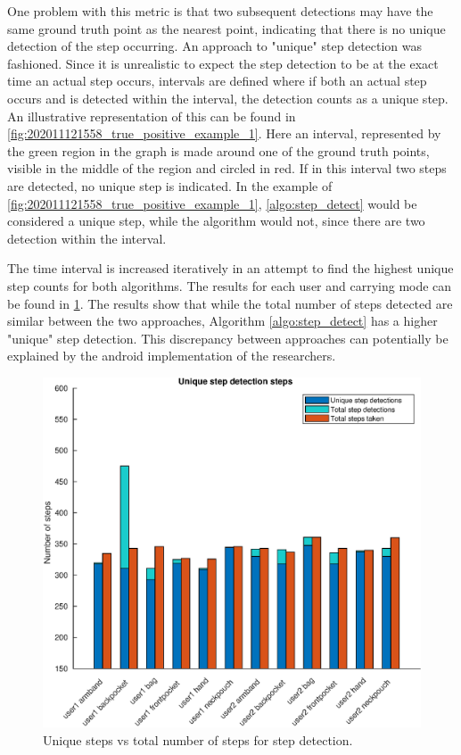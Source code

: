 One problem with this metric is that two subsequent detections may have the same ground truth point as the nearest point, indicating that there is no unique detection of the step occurring. An approach to "unique" step detection was fashioned. Since it is unrealistic to expect the step detection to be at the exact time an actual step occurs, intervals are defined where if both an actual step occurs and is detected within the interval, the detection counts as a unique step. An illustrative representation of this can be found in \cref{fig:202011121558_true_positive_example_1}. Here an interval, represented by the green region in the graph is made around one of the ground truth points, visible in the middle of the region and circled in red. If in this interval two steps are detected, no unique step is indicated. In the example of  \cref{fig:202011121558_true_positive_example_1},  \cref{algo:step_detect} would be considered a unique step, while the \citet{Salvi2018} algorithm would not, since there are two detection within the interval.

The time interval is increased iteratively in an attempt to find the highest unique step counts for both algorithms. The results for each user and carrying mode can be found in \cref{fig:sd_tp_fp_comparison}. The results show that while the total number of steps detected are similar between the two approaches, Algorithm \ref{algo:step_detect} has a higher "unique" step detection. This discrepancy between approaches can potentially be explained by the android implementation of the researchers. 

\begin{figure}[H]
	\centering
	\includegraphics[width=0.7\linewidth]{images/20201127_1626_Unique_step_detection_steps}
	\setlength{\belowcaptionskip}{-20pt}
\caption[False positives and true positives step detection comparison]{Unique steps vs total number of steps for step detection. }
\label{fig:sd_tp_fp_comparison}
\end{figure}

